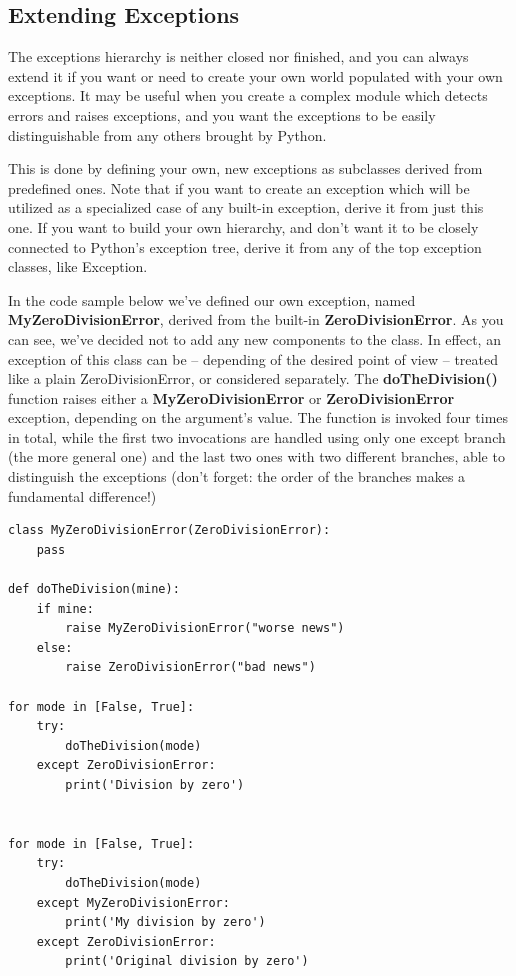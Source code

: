 \documentclass[11pt]{article}
\begin{document}
\subsection{Extending Exceptions}
\label{sec:org7bf1461}
The exceptions hierarchy is neither closed nor finished, and you can
always extend it if you want or need to create your own world
populated with your own exceptions. It may be useful when you create a
complex module which detects errors and raises exceptions, and you
want the exceptions to be easily distinguishable from any others
brought by Python.

This is done by defining your own, new exceptions as subclasses
derived from predefined ones.  Note that if you want to create an
exception which will be utilized as a specialized case of any built-in
exception, derive it from just this one. If you want to build your own
hierarchy, and don’t want it to be closely connected to Python’s
exception tree, derive it from any of the top exception classes, like
Exception.

In the code sample below we’ve defined our own exception, named
\textbf{MyZeroDivisionError}, derived from the built-in
\textbf{ZeroDivisionError}. As you can see, we’ve decided not to add any new
components to the class. In effect, an exception of this class can be
– depending of the desired point of view – treated like a plain
ZeroDivisionError, or considered separately.  The \textbf{doTheDivision()}
function raises either a \textbf{MyZeroDivisionError} or \textbf{ZeroDivisionError}
exception, depending on the argument’s value. The function is invoked
four times in total, while the first two invocations are handled using
only one except branch (the more general one) and the last two ones
with two different branches, able to distinguish the exceptions (don’t
forget: the order of the branches makes a fundamental difference!)

\begin{verbatim}
class MyZeroDivisionError(ZeroDivisionError):
	pass

def doTheDivision(mine):
	if mine:
		raise MyZeroDivisionError("worse news")
	else:		
		raise ZeroDivisionError("bad news")

for mode in [False, True]:
	try:
		doTheDivision(mode)
	except ZeroDivisionError:
		print('Division by zero')


for mode in [False, True]:
	try:
		doTheDivision(mode)
	except MyZeroDivisionError:
		print('My division by zero')
	except ZeroDivisionError:
		print('Original division by zero')		
\end{verbatim}
\end{document}
